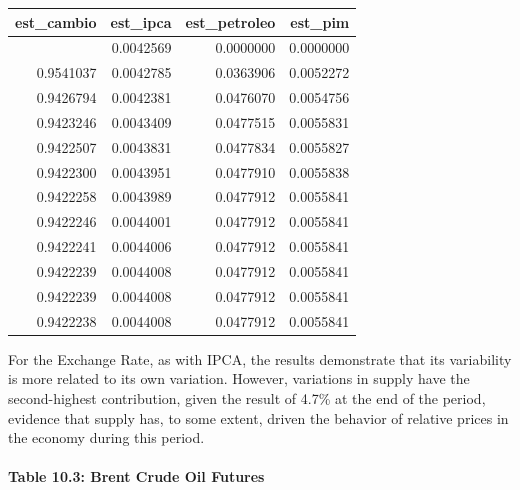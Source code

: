 \documentclass[12pt]{article}
\begin{document}
\begin{longtable}[]{@{}rrrr@{}}
\toprule\noalign{}
est\_cambio & est\_ipca & est\_petroleo & est\_pim \\
\midrule\noalign{}
\endhead
\bottomrule\noalign{}
\endlastfoot
0.9957431 & 0.0042569 & 0.0000000 & 0.0000000 \\
0.9541037 & 0.0042785 & 0.0363906 & 0.0052272 \\
0.9426794 & 0.0042381 & 0.0476070 & 0.0054756 \\
0.9423246 & 0.0043409 & 0.0477515 & 0.0055831 \\
0.9422507 & 0.0043831 & 0.0477834 & 0.0055827 \\
0.9422300 & 0.0043951 & 0.0477910 & 0.0055838 \\
0.9422258 & 0.0043989 & 0.0477912 & 0.0055841 \\
0.9422246 & 0.0044001 & 0.0477912 & 0.0055841 \\
0.9422241 & 0.0044006 & 0.0477912 & 0.0055841 \\
0.9422239 & 0.0044008 & 0.0477912 & 0.0055841 \\
0.9422239 & 0.0044008 & 0.0477912 & 0.0055841 \\
0.9422238 & 0.0044008 & 0.0477912 & 0.0055841 \\
\end{longtable}

For the Exchange Rate, as with IPCA, the results demonstrate that its
variability is more related to its own variation. However, variations in
supply have the second-highest contribution, given the result of 4.7\%
at the end of the period, evidence that supply has, to some extent,
driven the behavior of relative prices in the economy during this
period.

\hypertarget{table-10.3-brent-crude-oil-futures}{%
\paragraph{Table 10.3: Brent Crude Oil
Futures}\label{table-10.3-brent-crude-oil-futures}}
\end{document}
